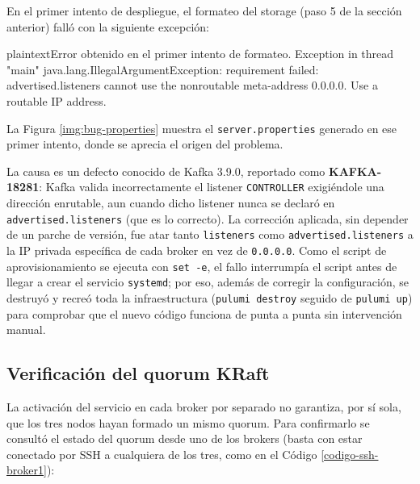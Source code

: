 		En el primer intento de despliegue, el formateo del storage (paso 5 de la sección anterior) falló con la siguiente excepción:

		\begin{sourcecode}[\label{codigo-bug-error}]{plaintext}{Error obtenido en el primer intento de formateo.}
Exception in thread "main" java.lang.IllegalArgumentException: requirement failed:
advertised.listeners cannot use the nonroutable meta-address 0.0.0.0.
Use a routable IP address.
		\end{sourcecode}

		La Figura \ref{img:bug-properties} muestra el \texttt{server.properties} generado en ese primer intento, donde se aprecia el origen del problema.


		La causa es un defecto conocido de Kafka 3.9.0, reportado como \textbf{KAFKA-18281}: Kafka valida incorrectamente el listener \texttt{CONTROLLER} exigiéndole una dirección enrutable, aun cuando dicho listener nunca se declaró en \texttt{advertised.listeners} (que es lo correcto). La corrección aplicada, sin depender de un parche de versión, fue atar tanto \texttt{listeners} como \texttt{advertised.listeners} a la IP privada específica de cada broker en vez de \texttt{0.0.0.0}. Como el script de aprovisionamiento se ejecuta con \texttt{set -e}, el fallo interrumpía el script antes de llegar a crear el servicio \texttt{systemd}; por eso, además de corregir la configuración, se destruyó y recreó toda la infraestructura (\texttt{pulumi destroy} seguido de \texttt{pulumi up}) para comprobar que el nuevo código funciona de punta a punta sin intervención manual.

	\subsection{Verificación del quorum KRaft}

		La activación del servicio en cada broker por separado no garantiza, por sí sola, que los tres nodos hayan formado un mismo quorum. Para confirmarlo se consultó el estado del quorum desde uno de los brokers (basta con estar conectado por SSH a cualquiera de los tres, como en el Código \ref{codigo-ssh-broker1}):

